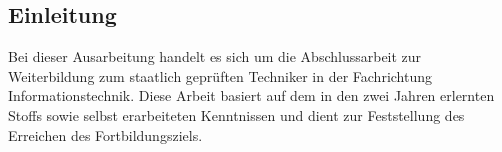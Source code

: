 \subsection{Einleitung}\label{vw_einleitung}
Bei dieser Ausarbeitung handelt es sich um die Abschlussarbeit zur Weiterbildung zum staatlich geprüften Techniker in der Fachrichtung Informationstechnik.
Diese Arbeit basiert auf dem in den zwei Jahren erlernten Stoffs sowie selbst erarbeiteten Kenntnissen und dient zur Feststellung des Erreichen des Fortbildungsziels.